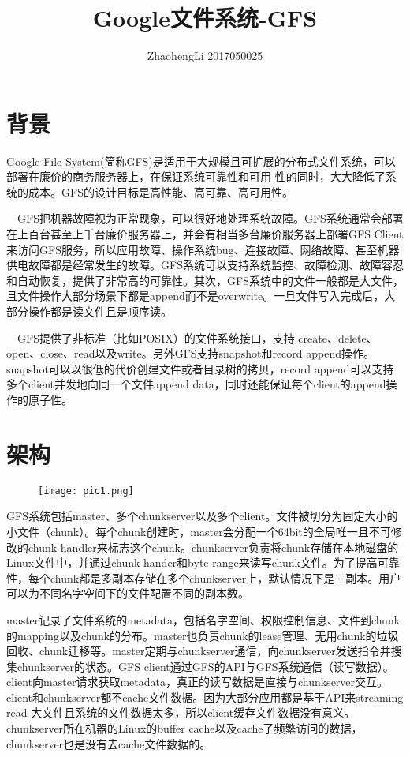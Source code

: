 \documentclass{article}
\title{Google文件系统-GFS}
\author{ZhaohengLi 2017050025}
\begin{document}
\maketitle

\section{背景}
Google File System(简称GFS)是适用于大规模且可扩展的分布式文件系统，可以部署在廉价的商务服务器上，在保证系统可靠性和可用 性的同时，大大降低了系统的成本。GFS的设计目标是高性能、高可靠、高可用性。


  GFS把机器故障视为正常现象，可以很好地处理系统故障。GFS系统通常会部署在上百台甚至上千台廉价服务器上，并会有相当多台廉价服务器上部署GFS Client来访问GFS服务，所以应用故障、操作系统bug、连接故障、网络故障、甚至机器供电故障都是经常发生的故障。GFS系统可以支持系统监控、故障检测、故障容忍和自动恢复，提供了非常高的可靠性。其次，GFS系统中的文件一般都是大文件，且文件操作大部分场景下都是append而不是overwrite。一旦文件写入完成后，大部分操作都是读文件且是顺序读。

  GFS提供了非标准（比如POSIX）的文件系统接口，支持 create、delete、open、close、read以及write。另外GFS支持snapshot和record append操作。snapshot可以以很低的代价创建文件或者目录树的拷贝，record append可以支持多个client并发地向同一个文件append data，同时还能保证每个client的append操作的原子性。

\section{架构}

\begin{figure}[H]
    \centering
    \texttt{[image: pic1.png]}
\end{figure}

GFS系统包括master、多个chunkserver以及多个client。文件被切分为固定大小的小文件（chunk）。每个chunk创建时，master会分配一个64bit的全局唯一且不可修改的chunk handler来标志这个chunk。chunkserver负责将chunk存储在本地磁盘的Linux文件中，并通过chunk hander和byte range来读写chunk文件。为了提高可靠性，每个chunk都是多副本存储在多个chunkserver上，默认情况下是三副本。用户可以为不同名字空间下的文件配置不同的副本数。


master记录了文件系统的metadata，包括名字空间、权限控制信息、文件到chunk的mapping以及chunk的分布。master也负责chunk的lease管理、无用chunk的垃圾回收、chunk迁移等。master定期与chunkserver通信，向chunkserver发送指令并搜集chunkserver的状态。GFS client通过GFS的API与GFS系统通信（读写数据）。client向master请求获取metadata，真正的读写数据是直接与chunkserver交互。client和chunkserver都不cache文件数据。因为大部分应用都是基于API来streaming read 大文件且系统的文件数据太多，所以client缓存文件数据没有意义。chunkserver所在机器的Linux的buffer cache以及cache了频繁访问的数据，chunkserver也是没有去cache文件数据的。
\end{document}
